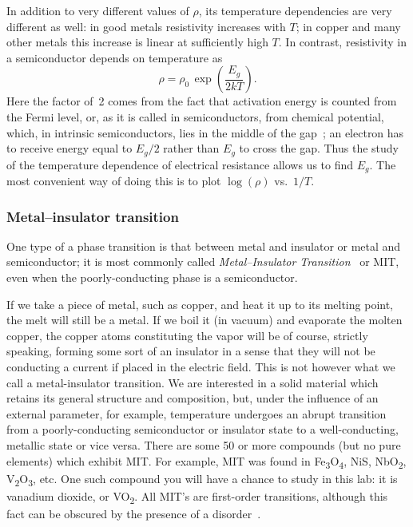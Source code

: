 \documentclass[11pt,a4paper]{article}
\newcommand{\VOtwo}{VO\textsubscript{2}}
\begin{document}
In addition to very different values of $\rho$, its temperature dependencies are
very different as well: in good metals resistivity increases with $T$; in copper
and many other metals this increase is linear at sufficiently high $T$. In
contrast, resistivity in a semiconductor depends on temperature as
\begin{equation}\label{eq:gap}
  \rho = \rho_0\,\exp\!\left(\frac{E_g}{2kT}\right).
\end{equation}
Here the factor of~2 comes from the fact that activation energy is counted from
the Fermi level, or, as it is called in semiconductors, from chemical potential,
which, in intrinsic semiconductors, lies in the middle of the
gap~\cite{ref:blakemore,ref:ashcroft}; an electron has to receive energy equal to
$E_g/2$ rather than $E_g$ to cross the gap. Thus the study of the temperature
dependence of electrical resistance allows us to find $E_g$. The most convenient
way of doing this is to plot $\log(\rho)$ vs.\ $1/T$.

\subsubsection{Metal--insulator transition}

One type of a phase transition is that between metal and insulator or metal and
semiconductor; it is most commonly called \emph{Metal--Insulator
Transition}~\cite{ref:dobro,ref:mottbook,ref:mott1949} or MIT, even when the
poorly-conducting phase is a semiconductor.

If we take a piece of metal, such as copper, and heat it up to its melting point,
the melt will still be a metal. If we boil it (in vacuum) and evaporate the molten
copper, the copper atoms constituting the vapor will be of course, strictly
speaking, forming some sort of an insulator in a sense that they will not be
conducting a current if placed in the electric field. This is not however what we
call a metal-insulator transition. We are interested in a solid material which
retains its general structure and composition, but, under the influence of an
external parameter, for example, temperature undergoes an abrupt transition from a
poorly-conducting semiconductor or insulator state to a well-conducting, metallic
state or vice versa. There are some 50 or more compounds (but no pure elements)
which exhibit MIT. For example, MIT was found in
Fe\textsubscript{3}O\textsubscript{4}, NiS, NbO\textsubscript{2},
V\textsubscript{2}O\textsubscript{3}, etc. One such compound you will have a
chance to study in this lab: it is vanadium dioxide, or \VOtwo. All MIT's are
first-order transitions, although this fact can be obscured by the presence of a
disorder~\cite{ref:dobro}.
\end{document}
